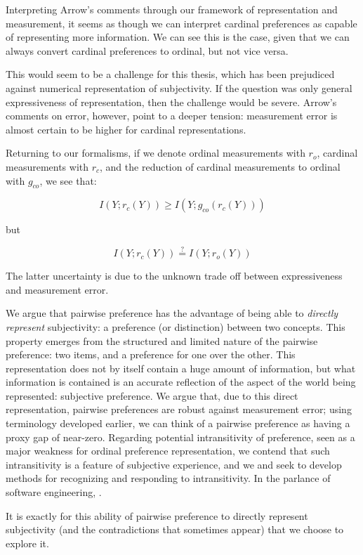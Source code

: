 \documentclass[12pt]{book}
\begin{document}
Interpreting Arrow's comments through our framework of representation and measurement, it seems as though we can interpret cardinal preferences as capable of representing more information.
We can see this is the case, given that we can always convert cardinal preferences to ordinal, but not vice versa.

This would seem to be a challenge for this thesis, which has been prejudiced against numerical representation of subjectivity.
If the question was only general expressiveness of representation, then the challenge would be severe.
Arrow's comments on error, however, point to a deeper tension: measurement error is almost certain to be higher for cardinal representations.

Returning to our formalisms, if we denote ordinal measurements with $r_o$, cardinal measurements with $r_c$, and the reduction of cardinal measurements to ordinal with $g_{co}$, we see that:

\[
I(Y; r_c(Y)) \geq I(Y; g_{co}(r_c(Y)))
\]

but 

\[
I(Y; r_c(Y)) \stackrel{?}{=} I(Y; r_o(Y))
\]

The latter uncertainty is due to the unknown trade off between expressiveness and measurement error.

\bigskip

We argue that pairwise preference has the advantage of being able to \textit{directly represent} subjectivity: a preference (or distinction) between two concepts.
This property emerges from the structured and limited nature of the pairwise preference: two items, and a preference for one over the other.
This representation does not by itself contain a huge amount of information, but what information is contained is an accurate reflection of the aspect of the world being represented: subjective preference.
We argue that, due to this direct representation, pairwise preferences are robust against measurement error; using terminology developed earlier, we can think of a pairwise preference as having a proxy gap of near-zero.
Regarding potential intransitivity of preference, seen as a major weakness for ordinal preference representation, we contend that such intransitivity is a feature of subjective experience, and we and seek to develop methods for recognizing and responding to intransitivity.
In the parlance of software engineering, .

It is exactly for this ability of pairwise preference to directly represent subjectivity (and the contradictions that sometimes appear) that we choose to explore it.
\end{document}

